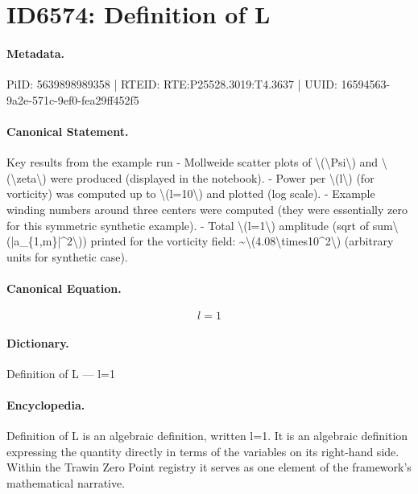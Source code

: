 \section*{ID6574: Definition of L}
\paragraph{Metadata.}
PiID: 5639898989358 | RTEID: RTE:P25528.3019:T4.3637 | UUID: 16594563-9a2e-571c-9ef0-fea29ff452f5

\paragraph{Canonical Statement.}
Key results from the example run - Mollweide scatter plots of \textbackslash{}(\textbackslash{}Psi\textbackslash{}) and \textbackslash{}(\textbackslash{}zeta\textbackslash{}) were produced (displayed in the notebook). - Power per \textbackslash{}(l\textbackslash{}) (for vorticity) was computed up to \textbackslash{}(l=10\textbackslash{}) and plotted (log scale). - Example winding numbers around three centers were computed (they were essentially zero for this symmetric synthetic example). - Total \textbackslash{}(l=1\textbackslash{}) amplitude (sqrt of sum\textbackslash{}(|a\_\{1,m\}|\textasciicircum{}2\textbackslash{})) printed for the vorticity field: \textasciitilde{}\textbackslash{}(4.08\textbackslash{}times10\textasciicircum{}2\textbackslash{}) (arbitrary units for synthetic case).

\paragraph{Canonical Equation.}
\[
l=1
\]

\paragraph{Dictionary.}
Definition of L — l=1

\paragraph{Encyclopedia.}
Definition of L is an algebraic definition, written l=1. It is an algebraic definition expressing the quantity directly in terms of the variables on its right-hand side. Within the Trawin Zero Point registry it serves as one element of the framework's mathematical narrative.
